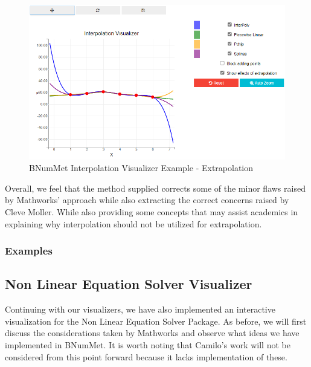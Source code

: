 \begin{figure}[H]
    \centering
    \includegraphics[width=\textwidth]{Include/Images/Thesis/Development/Visualizers/INTERPOLATION VISUALIZER/BNumMet.Interpolation.Ex1.2.png}
    \caption{BNumMet Interpolation Visualizer Example - Extrapolation}
    \label{fig:BNumMet Interpolation Visualizer Example - Extrapolation}
\end{figure}

Overall, we feel that the method supplied corrects some of the minor flaws raised by Mathworks' approach while also extracting the correct concerns raised by Cleve Moller. While also providing some concepts that may assist academics in explaining why interpolation should not be utilized for extrapolation. 
\subsubsection{Examples}
	

\subsection{Non Linear Equation Solver Visualizer}
Continuing with our visualizers, we have also implemented an interactive visualization for the Non Linear Equation Solver Package. As before, we will first discuss the considerations taken by Mathworks and observe what ideas we have implemented in BNumMet. It is worth noting that Camilo's work will not be considered from this point forward because it lacks implementation of these.

